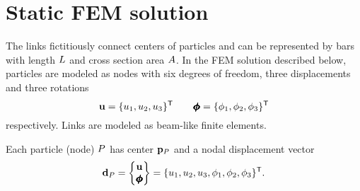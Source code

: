 \section{Static FEM solution}

The links fictitiously connect centers of particles and can be represented by bars with length $L$ and cross section area $A$.
In the FEM solution described below, particles are modeled as nodes with six degrees of freedom, three displacements and three rotations
\begin{equation}
	\displacementVector = \{\displacement_1, \displacement_2, \displacement_3\}\T
	\qquad
	\rotationVector = \{\rotation_1, \rotation_2, \rotation_3\}\T
\end{equation}
respectively.
Links are modeled as beam-like finite elements.

Each particle (node) $P$ has
center $\particlePosition_\particle$
and a nodal displacement vector
\begin{equation}
	\nodalDsplVector_\particle
	=
	\begin{Bmatrix} \displacementVector \\ \rotationVector \end{Bmatrix}
	=
	\{
		\displacement_1,
		\displacement_2,
		\displacement_3,
		\rotation_1,
		\rotation_2,
		\rotation_3
	\}\T
	.
\end{equation}

